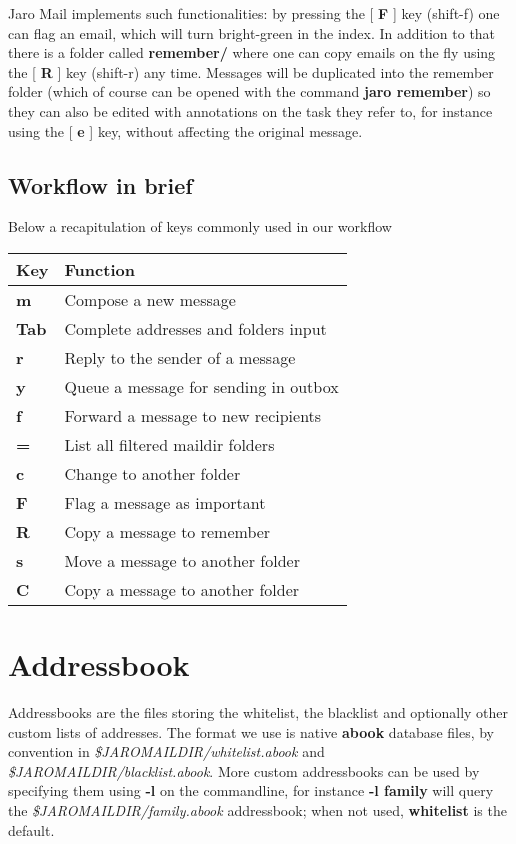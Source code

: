 \documentclass[a4,onecolumn,portrait]{article}
\begin{document}
Jaro Mail implements such functionalities: by pressing the [ \textbf{F} ] key
(shift-f) one can flag an email, which will turn bright-green in the
index. In addition to that there is a folder called \textbf{remember/} where
one can copy emails on the fly using the [ \textbf{R} ] key (shift-r) any
time. Messages will be duplicated into the remember folder (which of
course can be opened with the command \textbf{jaro remember}) so they can
also be edited with annotations on the task they refer to, for
instance using the [ \textbf{e} ] key, without affecting the original
message.
\subsection{Workflow in brief}
\label{sec-6-6}

Below a recapitulation of keys commonly used in our workflow

\begin{center}
\begin{tabular}{ll}
Key & Function\\
\hline
\textbf{m} & Compose a new message\\
\textbf{Tab} & Complete addresses and folders input\\
\textbf{r} & Reply to the sender of a message\\
\textbf{y} & Queue a message for sending in outbox\\
\textbf{f} & Forward a message to new recipients\\
\textbf{=} & List all filtered maildir folders\\
\textbf{c} & Change to another folder\\
\textbf{F} & Flag a message as important\\
\textbf{R} & Copy a message to remember\\
\textbf{s} & Move a message to another folder\\
\textbf{C} & Copy a message to another folder\\
\end{tabular}
\end{center}

\section{Addressbook}
\label{sec-7}

Addressbooks are the files storing the whitelist, the blacklist and optionally other custom lists of addresses. The format we use is native \textbf{abook} database files, by convention in \emph{\$JAROMAILDIR/whitelist.abook} and \emph{\$JAROMAILDIR/blacklist.abook}. More custom addressbooks can be used by specifying them using \textbf{-l} on the commandline, for instance \textbf{-l family} will query the \emph{\$JAROMAILDIR/family.abook} addressbook; when not used, \textbf{whitelist} is the default.
\end{document}
